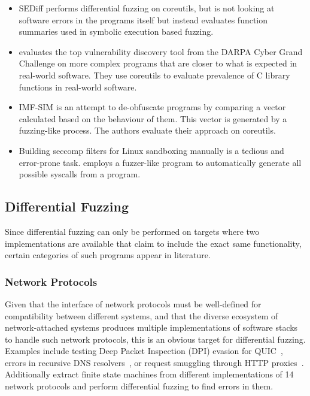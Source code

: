 \documentclass{article}
\let\savedCite=\cite
\renewcommand{\cite}{\unskip~\savedCite}
\begin{document}
\begin{multicols}{2}
    \begin{itemize}
        \item SEDiff performs differential fuzzing on coreutils, but is not looking at software errors in the programs itself but instead evaluates function summaries used in symbolic execution based fuzzing.\cite{SEDiff}
        \item \citeauthor{DarpaExtended} evaluates the top vulnerability discovery tool from the DARPA Cyber Grand Challenge on more complex programs that are closer to what is expected in real-world software. They use coreutils to evaluate prevalence of C library functions in real-world software.\cite{DarpaExtended}
        \item IMF-SIM is an attempt to de-obfuscate programs by comparing a vector calculated based on the behaviour of them. This vector is generated by a fuzzing-like process. The authors evaluate their approach on coreutils.\cite{IMF-SIM}
        \item Building seccomp filters for Linux sandboxing manually is a tedious and error-prone task. \citeauthor{Seccomp} employs a fuzzer-like program to automatically generate all possible syscalls from a program.\cite{Seccomp}
    \end{itemize}

    \subsection{Differential Fuzzing}

    Since differential fuzzing can only be performed on targets where two implementations are available that claim to include the exact same functionality, certain categories of such programs appear in literature.

    \subsubsection{Network Protocols}

    Given that the interface of network protocols must be well-defined for compatibility between different systems, and that the diverse ecosystem of network-attached systems produces multiple implementations of software stacks to handle such network protocols, this is an obvious target for differential fuzzing. Examples include testing Deep Packet Inspection (DPI) evasion for QUIC\cite{DPIFuzz}, errors in recursive DNS resolvers\cite{ResolFuzz}, or request smuggling through HTTP proxies\cite{T-Reqs}. Additionally \citeauthor{ParDiff} extract finite state machines from different implementations of 14 network protocols and perform differential fuzzing to find errors in them.\cite{ParDiff}


\end{multicols}
\end{document}
